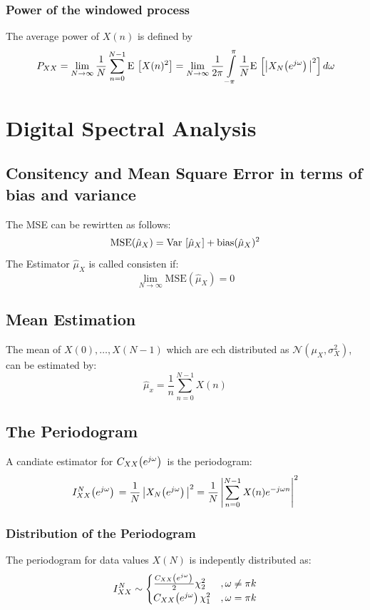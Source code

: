 \documentclass[accentcolor=tud4c,9.5pt,nochapname,bigchapter,paper=a5report]{tudreport}
\begin{document}
\subsection{Power of the windowed process}
The average power of $X(n)$ is defined by
\begin{equation}
P_{XX}=\lim\limits_{N\rightarrow\infty}\frac{1}{N}\sum\limits_{n=0}^{N-1}{\rm E}\,\left[X(n)^2\right] =
\lim\limits_{N\rightarrow\infty}\frac{1}{2\pi}\int\limits_{-\pi}^{\pi}\frac{1}{N}{\rm E}\,\left[\left|X_N{\left(e^{j\omega}\right)}\,\right|^2\right] d\omega
\end{equation}

\chapter{Digital Spectral Analysis}
\section{Consitency and Mean Square Error in terms of bias and variance}
The MSE can be rewirtten as follows:
\begin{equation}
\text{MSE}(\hat{\mu}_X)={\rm Var}\, \left[\hat{\mu}_X\right] + \text{bias}(\hat{\mu}_X)^2
\end{equation}
The Estimator $\hat{\mu}_X$ is called consisten if:
\begin{equation}
\lim\limits_{N\rightarrow\infty} \text{MSE}(\hat{\mu}_X) = 0
\end{equation}
\section{Mean Estimation}
The mean of $X(0),\ldots ,X(N-1)$ which are ech distributed as $\mathcal{N}(\mu_X,\sigma_X^2)$, can be estimated by:
\begin{equation}
\hat{{\mu}}_x=\frac{1}{n}\sum\limits_{n=0}^{N-1}X(n)
\end{equation}

\section{The Periodogram}
A candiate estimator for $C_{XX}{\left(e^{j\omega}\right)}\,$ is the periodogram:
\begin{equation}
I_{XX}^{N}{\left(e^{j\omega}\right)}\, = \frac{1}{N}\left|X_N{\left(e^{j\omega}\right)}\,\right|^2 = \frac{1}{N}\left|\sum\limits_{n=0}^{N-1} X(n) e^{-j\omega n}\right|^2
\end{equation}
\subsection{Distribution of the Periodogram}
The periodogram for data values $X(N)$ is indepently distributed as:
\begin{equation}
I_{XX}^{N} \sim \begin{cases}
\frac{C_{XX}{\left(e^{j\omega}\right)}\,}{2}\chi_2^2 &,\omega \neq \pi k \\
C_{XX}{\left(e^{j\omega}\right)}\,\chi_1^2 &,\omega = \pi k \\
\end{cases}
\end{equation}
\end{document}
